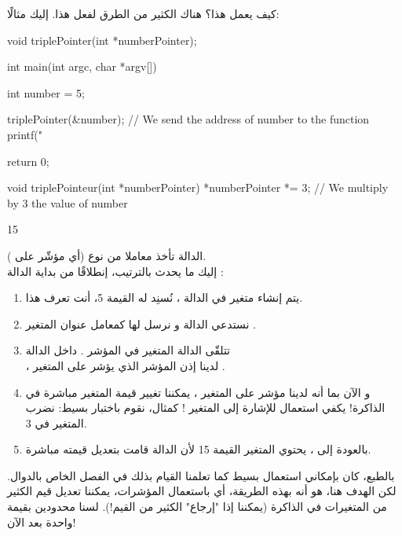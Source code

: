 كيف يعمل هذا؟ هناك الكثير من الطرق لفعل هذا. إليك مثالًا:
\begin{Csource}
void triplePointer(int *numberPointer);

int main(int argc, char *argv[])
{
	int number = 5;

	triplePointer(&number); // We send the address of number to the function
	printf("%

	return 0;
}

void triplePointeur(int *numberPointer)
{
	*numberPointer *= 3; // We multiply by 3 the value of number
}
\end{Csource}
\begin{Console}
15
\end{Console}
الدالة
تأخذ معاملا من نوع
(أي مؤشّر على
).\\
إليك ما يحدث بالترتيب، إنطلاقًا من بداية الدالة
:
\begin{enumerate}
	\item يتم إنشاء متغير
في الدالة
،
نُسنِد له القيمة 5، أنت تعرف هذا.
	\item نستدعي الدالة
و نرسل لها كمعامل عنوان المتغير
.
	\item تتلقّى الدالة
المتغير في المؤشر
.
داخل الدالة\\
،
لدينا إذن المؤشر
الذي يؤشر على المتغير
.
	\item و الآن بما أنه لدينا مؤشر على المتغير
،
يمكننا تغيير قيمة المتغير
مباشرة في الذاكرة! يكفي استعمال
للإشارة إلى المتغير
!
كمثال، نقوم باختبار بسيط: نضرب المتغير في 3.
	\item بالعودة إلى
،
يحتوي المتغير
القيمة 15 لأن الدالة
قامت بتعديل قيمته مباشرة.
\end{enumerate}

بالطبع، كان بإمكاني استعمال
بسيط كما تعلمنا القيام بذلك في الفصل الخاص بالدوال. لكن الهدف هنا، هو أنه بهذه الطريقة، أي باستعمال المؤشرات، يمكننا تعديل قيم الكثير من المتغيرات في الذاكرة (يمكننا إذا "إرجاع" الكثير من القيم!). لسنا محدودين بقيمة واحدة بعد الآن!

